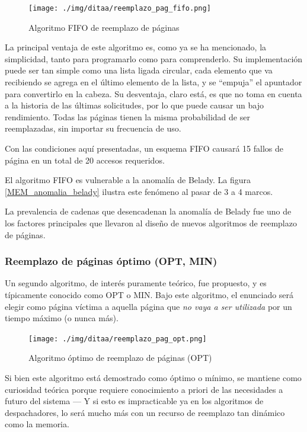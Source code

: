\documentclass[11pt,fleqn]{book} %
\begin{document}
\begin{figure}[htb]
\centering
\texttt{[image: ./img/ditaa/reemplazo\_pag\_fifo.png]}
\caption{\label{MEM_reemplazo_pag_fifo}Algoritmo FIFO de reemplazo de páginas}
\end{figure}

La principal ventaja de este algoritmo es, como ya se ha
mencionado, la simplicidad, tanto para programarlo como para
comprenderlo. Su implementación puede ser tan simple como una lista
ligada circular, cada elemento que va recibiendo se agrega en el
último elemento de la lista, y se ``empuja'' el apuntador para
convertirlo en la cabeza. Su desventaja, claro está, es que no toma
en cuenta a la historia de las últimas solicitudes, por lo que puede
causar un bajo rendimiento. Todas las páginas tienen la misma
probabilidad de ser reemplazadas, sin importar su frecuencia de uso.

Con las condiciones aquí presentadas, un esquema FIFO causará 15
fallos de página en un total de 20 accesos requeridos.

El algoritmo FIFO es vulnerable a la anomalía de Belady. La figura
\ref{MEM_anomalia_belady} ilustra este fenómeno al pasar de 3 a 4
marcos.

La prevalencia de cadenas que desencadenan la anomalía de Belady fue
uno de los factores principales que llevaron al diseño de nuevos
algoritmos de reemplazo de páginas.
\subsubsection{Reemplazo de páginas óptimo (OPT, MIN)}
\label{sec-5-5-3-2}


Un segundo algoritmo, de interés puramente teórico, fue
propuesto, y es típicamente conocido como OPT o MIN. Bajo este
algoritmo, el enunciado será elegir como página víctima a aquella
página que \emph{no vaya a ser utilizada} por un tiempo máximo (o nunca más).


\begin{figure}[htb]
\centering
\texttt{[image: ./img/ditaa/reemplazo\_pag\_opt.png]}
\caption{\label{MEM_reemplazo_pag_opt}Algoritmo óptimo de reemplazo de páginas (OPT)}
\end{figure}

Si bien este algoritmo está demostrado como óptimo o mínimo, se
mantiene como curiosidad teórica porque requiere conocimiento a priori
de las necesidades a futuro del sistema — Y si esto es impracticable ya en los
algoritmos de despachadores, lo será mucho más con un
recurso de reemplazo tan dinámico como la memoria.
\end{document}
